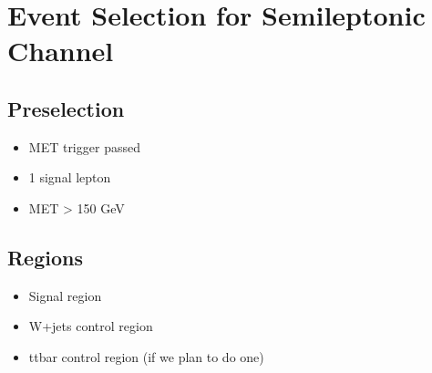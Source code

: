 \documentclass[12pt]{article}
\begin{document}
\section{Event Selection for Semileptonic Channel}

\subsection{Preselection}
\begin{itemize}
\item MET trigger passed
\item 1 signal lepton
\item MET > 150 GeV
\end{itemize}
\subsection{Regions}
\begin{itemize}
\item Signal region
\item W+jets control region
\item ttbar control region (if we plan to do one)
\end{itemize}
\end{document}
